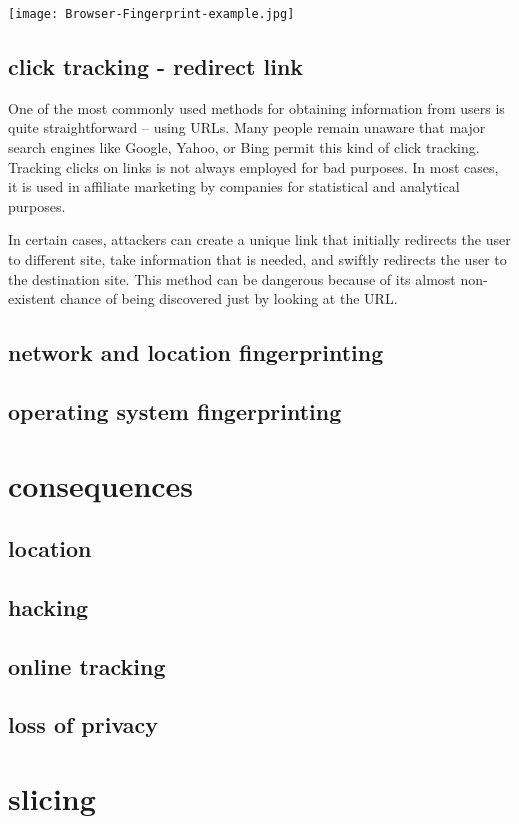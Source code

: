 \documentclass[10pt,a4paper,]{article}
\begin{document}
\begin{center}
\texttt{[image: Browser-Fingerprint-example.jpg]}
\end{center}
\subsection{click tracking - redirect link} 
One of the most commonly used methods for obtaining information from users is quite straightforward – using URLs. Many people remain unaware that major search engines like Google, Yahoo, or Bing permit this kind of click tracking. Tracking clicks on links is not always employed for bad purposes. In most cases, it is used in affiliate marketing by companies for statistical and analytical purposes. 

In certain cases, attackers can create a unique link that initially redirects the user to different site, take information that is needed, and swiftly redirects the user to the destination site. This method can be dangerous because of its almost non-existent chance of being discovered just by looking at the URL. 
\subsection{network and location fingerprinting}
\subsection{operating system fingerprinting}
\section{consequences}
\subsection{location}
\subsection{hacking}
\subsection{online tracking}
\subsection{loss of privacy}
\section{slicing} 
\end{document}
